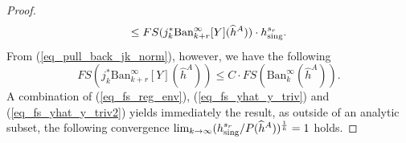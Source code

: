 \documentclass[12pt]{article}
\numberwithin{equation}{section}
\theoremstyle{theorem}
\theoremstyle{definition}
\theoremstyle{remark}
\begin{document}
\begin{proof}
\begin{equation}
			\leq
			FS(j_k^* {\textrm{Ban}}_{k + r}^{\infty}[Y](\widehat{h}^A))
			\cdot
			h^{s_r}_{\rm{sing}}.
		\end{equation}
		From (\ref{eq_pull_back_jk_norm}), however, we have the following
		\begin{equation}\label{eq_fs_yhat_y_triv2}
			FS(j_k^* {\textrm{Ban}}_{k + r}^{\infty}[Y](\widehat{h}^A))
			\leq
			C
			\cdot
			FS({\textrm{Ban}}_{k}^{\infty}(\widehat{h}^A)).
		\end{equation}
		A combination of (\ref{eq_fs_reg_env}), (\ref{eq_fs_yhat_y_triv}) and (\ref{eq_fs_yhat_y_triv2}) yields immediately the result, as outside of an analytic subset, the following convergence $\lim_{k \to \infty} (h^{s_r}_{\rm{sing}} / P(\widehat{h}^A))^{\frac{1}{k}} = 1$ holds. 
	\end{proof}
	
\end{document}
